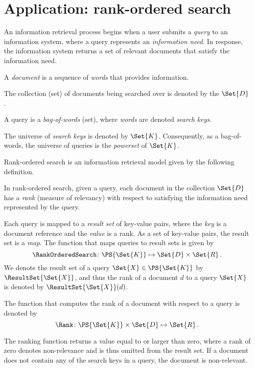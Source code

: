 \documentclass[ ../main.tex]{subfiles}
\begin{document}
\section{Application: rank-ordered search}
An information retrieval process begins when a user submits a \emph{query} to an information system, where a query represents an \emph{information need}. In response, the information system returns a set of relevant documents that satisfy the information need.
\begin{assumption}
A \emph{document} is a sequence of \emph{words} that provides information.
\end{assumption}
The collection (set) of documents being searched over is denoted by the $\Set{D}$.

\begin{assumption}
A query is a \emph{bag-of-words} (set), where \emph{words} are denoted \emph{search keys}.
\end{assumption}
The universe of \emph{search keys} is denoted by $\Set{K}$. Consequently, as a bag-of-words, the universe of queries is the \emph{powerset} of $\Set{K}$.

Rank-ordered search is an information retrieval model given by the following definition.
\begin{definition}
In rank-ordered search, given a query, each document in the collection $\Set{D}$ has a \emph{rank} (measure of relevancy) with respect to satisfying the information need represented by the query.
\end{definition}
Each query is mapped to a \emph{result set} of key-value pairs, where the \emph{key} is a document reference and the \emph{value} is a rank. As a set of key-value pairs, the result set is a \emph{map}. The function that maps queries to result sets is given by
\begin{equation}
    \RankOrderedSearch \colon \PS{\Set{K}} \mapsto \Set{D} \times \Set{R}\,.
\end{equation}
We denote the result set of a query $\Set{X} \in \PS{\Set{K}}$ by $\ResultSet{\Set{X}}$, and thus the rank of a document $d$ to a query $\Set{X}$ is denoted by $\ResultSet{\Set{X}}(d)$.

The function that computes the rank of a document with respect to a query is denoted by
\begin{equation}
    \Rank \colon \PS{\Set{K}} \times \Set{D} \mapsto \Set{R}\,.
\end{equation}
\begin{assumption}
The ranking function returns a value equal to or larger than zero, where a rank of zero denotes non-relevance and is thus omitted from the result set. If a document does not contain any of the search keys in a query, the document is non-relevant.
\end{assumption}
\end{document}
